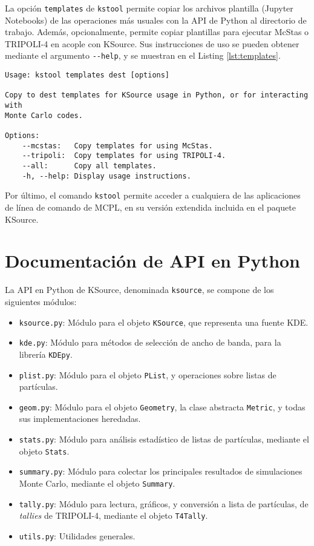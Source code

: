 La opción \verb|templates| de \verb|kstool| permite copiar los archivos plantilla (Jupyter Notebooks) de las operaciones más usuales con la API de Python al directorio de trabajo. Además, opcionalmente, permite copiar plantillas para ejecutar McStas o TRIPOLI-4 en acople con KSource. Sus instrucciones de uso se pueden obtener mediante el argumento \verb|--help|, y se muestran en el Listing \ref{lst:templates}.

\begin{lstlisting}[label={lst:templates}, caption=Instrucciones de uso del comando \texttt{kstool templates} (output de ``\texttt{kstool templates --help}'').]
Usage: kstool templates dest [options]

Copy to dest templates for KSource usage in Python, or for interacting with
Monte Carlo codes.

Options:
	--mcstas:   Copy templates for using McStas.
	--tripoli:  Copy templates for using TRIPOLI-4.
	--all:      Copy all templates.
	-h, --help: Display usage instructions.
\end{lstlisting}

Por último, el comando \verb|kstool| permite acceder a cualquiera de las aplicaciones de línea de comando de MCPL, en su versión extendida incluida en el paquete KSource.



\section{Documentación de API en Python}
\label{ap:Python}

La API en Python de KSource, denominada \verb|ksource|, se compone de los siguientes módulos:
\begin{itemize}
	\item \verb|ksource.py|: Módulo para el objeto \verb|KSource|, que representa una fuente KDE.
	\item \verb|kde.py|: Módulo para métodos de selección de ancho de banda, para la librería \verb|KDEpy|.
	\item \verb|plist.py|: Módulo para el objeto \verb|PList|, y operaciones sobre listas de partículas.
	\item \verb|geom.py|: Módulo para el objeto \verb|Geometry|, la clase abstracta \verb|Metric|, y todas sus implementaciones heredadas.
	\item \verb|stats.py|: Módulo para análisis estadístico de listas de partículas, mediante el objeto \verb|Stats|.
	\item \verb|summary.py|: Módulo para colectar los principales resultados de simulaciones Monte Carlo, mediante el objeto \verb|Summary|.
	\item \verb|tally.py|: Módulo para lectura, gráficos, y conversión a lista de partículas, de \emph{tallies} de TRIPOLI-4, mediante el objeto \verb|T4Tally|.
	\item \verb|utils.py|: Utilidades generales.
\end{itemize}

